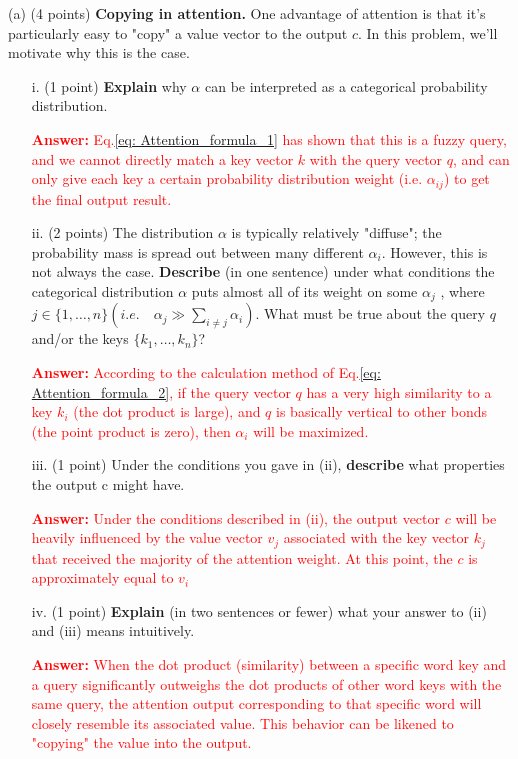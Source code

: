 \documentclass[letterpaper,12pt]{article}
\begin{document}
	\noindent(a) (4 points) \textbf{Copying in attention.} One advantage of attention is that it's particularly easy to "copy" a value vector to the output $c$. In this problem, we'll motivate why this is the case.
		
	\begin{itemize}
	\item [i.]
	(1 point) \textbf{Explain} why $\alpha$ can be interpreted as a categorical probability distribution.
			
	\textcolor{red}{\textbf{Answer:} Eq.\ref{eq: Attention_formula_1} has shown that this is a fuzzy query, and we cannot directly match a key vector $k$ with the query vector $q$, and can only give each key a certain probability distribution weight (i.e. $\alpha_{ij}$) to get the final output result.}

	\item [ii.]
	(2 points) The distribution $\alpha$ is typically relatively "diffuse"; the probability mass is spread out between many different $\alpha_i$. However, this is not always the case. \textbf{Describe} (in one sentence) under what conditions the categorical distribution $\alpha$ puts almost all of its weight on some $\alpha_j$ , where $j \in \{1, \ldots , n\} (i.e. \quad \alpha_j \gg \sum_{i\neq j} \alpha_i)$. What must be true about the query $q$ and/or the keys $\{k_1, \ldots , k_n\}$?
			
	\textcolor{red}{\textbf{Answer:} According to the calculation method of Eq.\ref{eq: Attention_formula_2}, if the query vector $q$ has a very high similarity to a key $k_i$ (the dot product is large), and $q$ is basically vertical to other bonds (the point product is zero), then $\alpha_i$ will be maximized.}

	\item [iii.]
	(1 point) Under the conditions you gave in (ii), \textbf{describe} what properties the output c might have.
			
	\textcolor{red}{\textbf{Answer:} Under the conditions described in (ii), the output vector $c$ will be heavily influenced by the value vector $v_j$ associated with the key vector $k_j$ that received the majority of the attention weight. At this point, the $c$ is approximately equal to $v_i$}

    \item [iv.]
	(1 point) \textbf{Explain} (in two sentences or fewer) what your answer to (ii) and (iii) means intuitively.
			
	\textcolor{red}{\textbf{Answer:} When the dot product (similarity) between a specific word key and a query significantly outweighs the dot products of other word keys with the same query, the attention output corresponding to that specific word will closely resemble its associated value. This behavior can be likened to "copying" the value into the output.}
	\end{itemize}	
		
\end{document}
